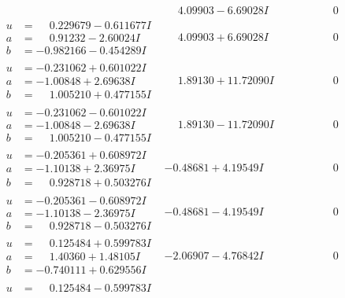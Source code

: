 \documentclass[1p]{elsarticle_modified}
\theoremstyle{definition}
\begin{document}
$$\begin{array}{c|c|c}
 & \phantom{-}4.09903 - 6.69028 I & \phantom{-0.000000 } 0 \\ \hline\begin{aligned}
u &= \phantom{-}0.229679 - 0.611677 I \\
a &= \phantom{-}0.91232 - 2.60024 I \\
b &= -0.982166 - 0.454289 I\end{aligned}
 & \phantom{-}4.09903 + 6.69028 I & \phantom{-0.000000 } 0 \\ \hline\begin{aligned}
u &= -0.231062 + 0.601022 I \\
a &= -1.00848 + 2.69638 I \\
b &= \phantom{-}1.005210 + 0.477155 I\end{aligned}
 & \phantom{-}1.89130 + 11.72090 I & \phantom{-0.000000 } 0 \\ \hline\begin{aligned}
u &= -0.231062 - 0.601022 I \\
a &= -1.00848 - 2.69638 I \\
b &= \phantom{-}1.005210 - 0.477155 I\end{aligned}
 & \phantom{-}1.89130 - 11.72090 I & \phantom{-0.000000 } 0 \\ \hline\begin{aligned}
u &= -0.205361 + 0.608972 I \\
a &= -1.10138 + 2.36975 I \\
b &= \phantom{-}0.928718 + 0.503276 I\end{aligned}
 & -0.48681 + 4.19549 I & \phantom{-0.000000 } 0 \\ \hline\begin{aligned}
u &= -0.205361 - 0.608972 I \\
a &= -1.10138 - 2.36975 I \\
b &= \phantom{-}0.928718 - 0.503276 I\end{aligned}
 & -0.48681 - 4.19549 I & \phantom{-0.000000 } 0 \\ \hline\begin{aligned}
u &= \phantom{-}0.125484 + 0.599783 I \\
a &= \phantom{-}1.40360 + 1.48105 I \\
b &= -0.740111 + 0.629556 I\end{aligned}
 & -2.06907 - 4.76842 I & \phantom{-0.000000 } 0 \\ \hline\begin{aligned}
u &= \phantom{-}0.125484 - 0.599783 I \\

\end{aligned}
\end{array}$$
\end{document}
